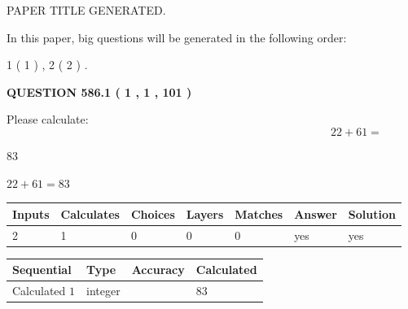 \documentclass[12pt]{article}
\begin{document}
   
 PAPER TITLE GENERATED.
   
   
   
\vspace{0.2in}
   
In this paper, big questions will be generated in the following order: 
   
   
   1 ( 1 )
 ,
   2 ( 2 )
 .
  
\vspace{0.2in}
  
{\textbf{\Large{QUESTION
586.1 
 ( 1 , 1 , 101 )
}}}
  
  
 
Please calculate:
\begin{equation}
22 +  %
61 = \nonumber
\end{equation}
 
 
 
\noindent{}
 
 

83
 
 
\noindent{}
 
 

 
 
 
\noindent{}
 
 

$ %
22 +  %
61=   %
83$
 
 
\noindent{}
 
 

 
   
   
   
   
\noindent\begin{tabular}{|l|l|l|l|l|l|l|}
 \hline
Inputs & Calculates & Choices & Layers & Matches & Answer & Solution \\ \hline
 2  & 
 1  & 
 0
  & 
 0  & 
 0  & 
  yes & 
  yes 
  \\ \hline
 \end{tabular}
   
   
   
   
\noindent{}
   
   
  
  
\noindent\begin{tabular}{|l|l|l|l|}
\hline
 Sequential & Type & Accuracy & Calculated \\ 
\hline
 
 
  Calculated $  1 $ & integer &  & 
  $ 83 $ 
 \\  \hline  
 \end{tabular}
   
\end{document}
